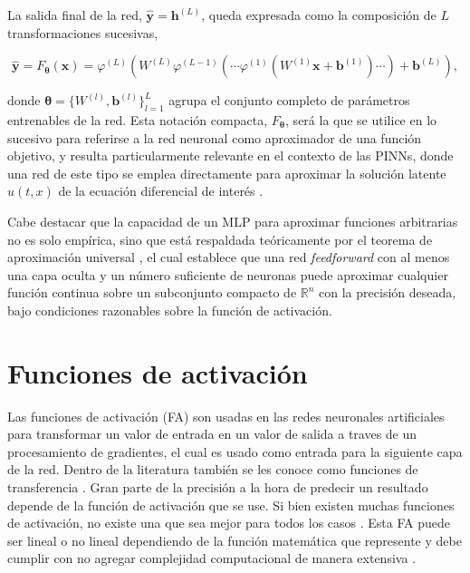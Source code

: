 La salida final de la red, $\hat{\mathbf{y}} = \mathbf{h}^{(L)}$, queda expresada como la composición de $L$ transformaciones sucesivas,

\begin{equation}
    \hat{\mathbf{y}} = F_{\boldsymbol{\theta}}(\mathbf{x}) = \varphi^{(L)}\!\left(W^{(L)} \varphi^{(L-1)}\!\left(\cdots \varphi^{(1)}\!\left(W^{(1)}\mathbf{x} + \mathbf{b}^{(1)}\right)\cdots\right) + \mathbf{b}^{(L)}\right),
    \label{eq:mlp_forward}
\end{equation}

\noindent donde $\boldsymbol{\theta} = \{W^{(l)}, \mathbf{b}^{(l)}\}_{l=1}^{L}$ agrupa el conjunto completo de parámetros entrenables de la red. Esta notación compacta, $F_{\boldsymbol{\theta}}$, será la que se utilice en lo 
sucesivo para referirse a la red neuronal como aproximador de una función objetivo, y resulta particularmente relevante en el contexto de las PINNs, donde una red de este tipo se emplea directamente para aproximar 
la solución latente $u(t,x)$ de la ecuación diferencial de interés \cite{goodfellow2016deep}.

Cabe destacar que la capacidad de un MLP para aproximar funciones arbitrarias no es solo empírica, sino que está respaldada teóricamente por el teorema de aproximación universal \cite{HORNIK1989359}, 
el cual establece que una red \textit{feedforward} con al menos una capa oculta y un número suficiente de neuronas puede aproximar cualquier función continua sobre un subconjunto compacto 
de $\mathbb{R}^n$ con la precisión deseada, bajo condiciones razonables sobre la función de activación.


\section{Funciones de activación}
Las funciones de activación (FA) son usadas en las redes neuronales artificiales para transformar un valor de entrada en un valor de salida a traves de un procesamiento de gradientes, el cual es usado como entrada 
para la siguiente capa de la red. Dentro de la literatura también se les conoce como funciones de transferencia \cite{nwankpa2018activation}. Gran parte de la precisión a la hora de predecir un resultado depende de la función de activación que se use. 
Si bien existen muchas funciones de activación, no existe una que sea mejor para todos los casos \cite{sharma2017activation}. Esta FA puede ser lineal o no lineal dependiendo de la función matemática que represente y debe cumplir
con no agregar complejidad computacional de manera extensiva \cite{dubey2022activation}.

